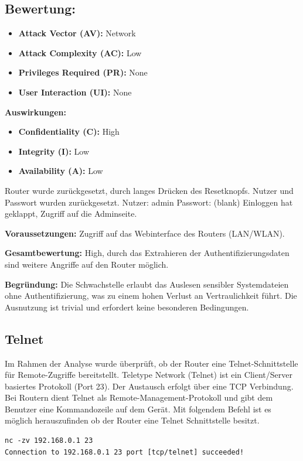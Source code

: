 	\subsection{Bewertung:}
	\label{sec:lfi}

	\begin{itemize}
		\item \textbf{Attack Vector (AV):} Network
		\item \textbf{Attack Complexity (AC):} Low
		\item \textbf{Privileges Required (PR):} None
		\item \textbf{User Interaction (UI):} None
	\end{itemize}

	\textbf{Auswirkungen:}
	\begin{itemize}
		\item \textbf{Confidentiality (C):} High
		\item \textbf{Integrity (I):} Low
		\item \textbf{Availability (A):} Low
	\end{itemize}


	Router wurde zurückgesetzt, durch langes Drücken des Resetknopfs.
	Nutzer und Passwort wurden zurückgesetzt.
	Nutzer: admin
	Passwort: (blank)
	Einloggen hat geklappt, Zugriff auf die Adminseite.


	\textbf{Voraussetzungen:}  
	Zugriff auf das Webinterface des Routers (LAN/WLAN).

	\textbf{Gesamtbewertung:}  
	High, durch das Extrahieren der Authentifizierungsdaten sind weitere Angriffe auf den Router möglich.

	\textbf{Begründung:}  
	Die Schwachstelle erlaubt das Auslesen sensibler Systemdateien ohne
	Authentifizierung, was zu einem hohen Verlust an Vertraulichkeit führt.
	Die Ausnutzung ist trivial und erfordert keine besonderen Bedingungen.

	\subsection{Telnet}
	Im Rahmen der Analyse wurde überprüft, ob der Router eine Telnet-Schnittstelle für Remote-Zugriffe bereitstellt.
	Teletype Network (Telnet) ist ein Client/Server basiertes Protokoll (Port 23).
	Der Austausch erfolgt über eine TCP Verbindung. Bei Routern dient Telnet als Remote-Management-Protokoll
	und gibt dem Benutzer eine Kommandozeile auf dem Gerät.
	Mit folgendem Befehl ist es möglich herauszufinden ob der Router eine Telnet Schnittstelle besitzt.
\begin{lstlisting}[basicstyle=\ttfamily]
nc -zv 192.168.0.1 23
Connection to 192.168.0.1 23 port [tcp/telnet] succeeded!
\end{lstlisting}
	
